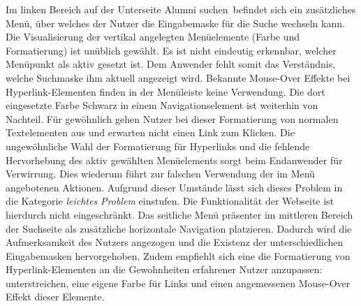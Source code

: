 {
	Im linken Bereich auf der Unterseite \glqq Alumni suchen\grqq ~befindet sich ein zusätzliches Menü, über welches der Nutzer die Eingabemaske für die Suche wechseln kann. Die Visualisierung der vertikal angelegten Menüelemente (Farbe und Formatierung) ist unüblich gewählt. Es ist nicht eindeutig erkennbar, welcher Menüpunkt als aktiv gesetzt ist. Dem Anwender fehlt somit das Verständnis, welche Suchmaske ihm aktuell angezeigt wird. Bekannte Mouse-Over Effekte bei Hyperlink-Elementen finden in der Menüleiste keine Verwendung. Die dort eingesetzte Farbe Schwarz in einem Navigationselement ist weiterhin von Nachteil. Für gewöhnlich gehen Nutzer bei dieser Formatierung von normalen Textelementen aus und erwarten nicht einen Link zum Klicken.
}
{
	Die ungewöhnliche Wahl der Formatierung für Hyperlinks und die fehlende Hervorhebung des aktiv gewählten Menüelements sorgt beim Endanwender für Verwirrung. Dies wiederum führt zur falschen Verwendung der im Menü angebotenen Aktionen. Aufgrund dieser Umstände lässt sich dieses Problem in die Kategorie \emph{leichtes Problem} einstufen. Die Funktionalität der Webseite ist hierdurch nicht eingeschränkt.
}
{
	Das seitliche Menü präsenter im mittleren Bereich der Suchseite als zusätzliche horizontale Navigation platzieren. Dadurch wird die Aufmerksamkeit des Nutzers angezogen und die Existenz der unterschiedlichen Eingabemasken hervorgehoben. Zudem empfiehlt sich eine die Formatierung von Hyperlink-Elementen an die Gewohnheiten erfahrener Nutzer anzupassen: unterstreichen, eine eigene Farbe für Links und einen angemessenen Mouse-Over Effekt dieser Elemente.
}




